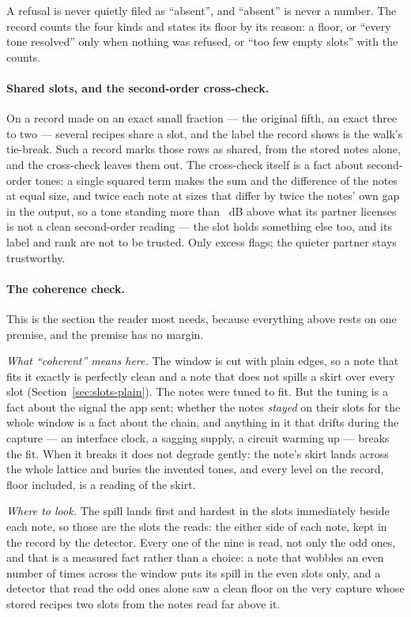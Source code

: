 \documentclass[11pt,a4paper]{article}
\begin{document}
A refusal is never quietly filed as ``absent'', and ``absent'' is never
a number. The record counts the four kinds and states its floor by its
reason: a floor, or ``every tone resolved'' only when nothing was
refused, or ``too few empty slots'' with the counts.

\paragraph{Shared slots, and the second-order cross-check.} On a record
made on an exact small fraction --- the original fifth, an exact three to
two --- several recipes share a slot, and the label the record shows is
the walk's tie-break. Such a record marks those rows as shared, from the
stored notes alone, and the cross-check leaves them out. The cross-check
itself is a fact about second-order tones: a single squared term makes
the sum and the difference of the notes at equal size, and twice each
note at sizes that differ by twice the notes' own gap in the output, so a
tone standing more than \imdPartnerToleranceDB{}~dB above what its
partner licenses is not a clean second-order reading --- the slot holds
something else too, and its label and rank are not to be trusted. Only
excess flags; the quieter partner stays trustworthy.

\paragraph{The coherence check.} This is the section the reader most
needs, because everything above rests on one premise, and the premise
has no margin.

\emph{What ``coherent'' means here.} The window is cut with plain edges,
so a note that fits it exactly is perfectly clean and a note that does
not spills a skirt over every slot (Section~\ref{sec:slots-plain}). The
notes were tuned to fit. But the tuning is a fact about the signal the
app sent; whether the notes \emph{stayed} on their slots for the whole
window is a fact about the chain, and anything in it that drifts during
the capture --- an interface clock, a sagging supply, a circuit warming
up --- breaks the fit. When it breaks it does not degrade gently: the
note's skirt lands across the whole lattice and buries the invented
tones, and every level on the record, floor included, is a reading of the
skirt.

\emph{Where to look.} The spill lands first and hardest in the slots
immediately beside each note, so those are the slots the
 reads: the \imdDetectorMaxOffset{} either side of
each note, kept in the record by the detector. Every one of the nine is
read, not only the odd ones, and that is a measured fact rather than a
choice: a note that wobbles an even number of times across the window
puts its spill in the even slots only, and a detector that read the odd
ones alone saw a clean floor on the very capture whose stored recipes two
slots from the notes read far above it.
\end{document}
